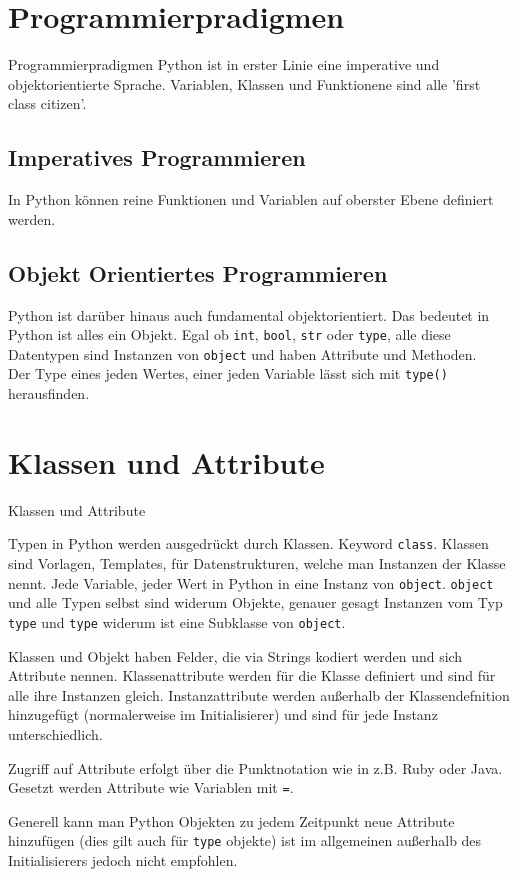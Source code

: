 \section{Programmierpradigmen}
\begin{frame}{Programmierpradigmen}
Python ist in erster Linie eine imperative und objektorientierte Sprache. Variablen, Klassen und Funktionene sind alle 'first class citizen'.

\subsection{Imperatives Programmieren}

In Python können reine Funktionen und Variablen auf oberster Ebene definiert werden.

\subsection{Objekt Orientiertes Programmieren}

Python ist darüber hinaus auch fundamental objektorientiert. Das bedeutet in Python ist alles ein Objekt. Egal ob \texttt{int}, \texttt{bool}, \texttt{str} oder \texttt{type}, alle diese Datentypen sind Instanzen von \texttt{object} und haben Attribute und Methoden.\\
Der Type eines jeden Wertes, einer jeden Variable lässt sich mit \texttt{type()} herausfinden.

\end{frame}


\section{Klassen und Attribute}
\begin{frame}{Klassen und Attribute}

Typen in Python werden ausgedrückt durch Klassen. Keyword \texttt{class}. Klassen sind Vorlagen, Templates, für Datenstrukturen, welche man Instanzen der Klasse nennt.
Jede Variable, jeder Wert in Python in eine Instanz von \texttt{object}. \texttt{object} und alle Typen selbst sind widerum Objekte, genauer gesagt Instanzen vom Typ \texttt{type} und \texttt{type} widerum ist eine Subklasse von \texttt{object}. 

Klassen und Objekt haben Felder, die via Strings kodiert werden und sich Attribute nennen. Klassenattribute werden für die Klasse definiert und sind für alle ihre Instanzen gleich. Instanzattribute werden außerhalb der Klassendefnition hinzugefügt (normalerweise im Initialisierer) und sind für jede Instanz unterschiedlich.

Zugriff auf Attribute erfolgt über die Punktnotation wie in z.B. Ruby oder Java. Gesetzt werden Attribute wie Variablen mit \texttt{=}.

Generell kann man Python Objekten zu jedem Zeitpunkt neue Attribute hinzufügen (dies gilt auch für \texttt{type} objekte) ist im allgemeinen außerhalb des Initialisierers jedoch nicht empfohlen.

\end{frame}


